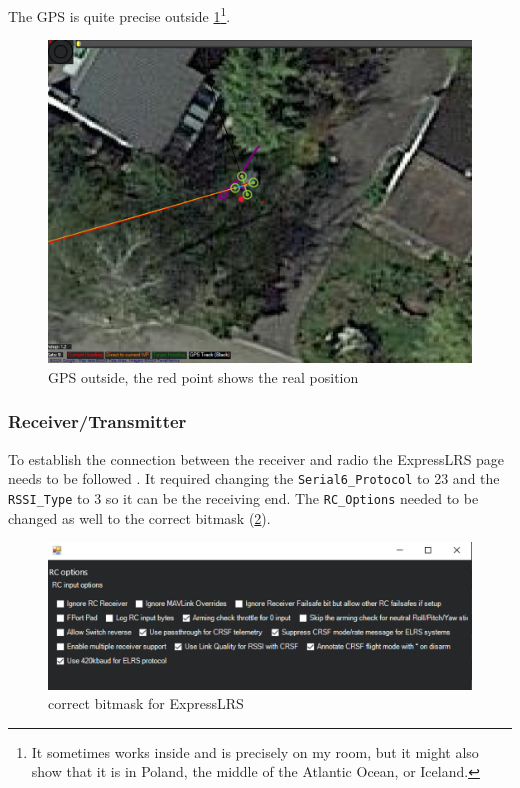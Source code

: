 \documentclass[svgnames]{article}
\begin{document}
	The GPS is quite precise outside \cref{fig:gpsoutside}\footnote{It sometimes works inside and is precisely on my room, but it might also show that it is in Poland, the middle of the Atlantic Ocean, or Iceland.}.
	
\begin{figure}[ht]
	\centering
	\includegraphics[scale=0.2]{pictures/GPS_Outsidewithdot}
	\caption{\gls{GPS} outside, the red point shows the real position}
	\label{fig:gpsoutside}
\end{figure}
	
	

	 
	\subsubsection{Receiver/Transmitter}
	To establish the connection between the receiver and radio the ExpressLRS page needs to be followed \cite{expresslrsorg}. It required changing the \lstinline|Serial6_Protocol| to 23 and the \lstinline|RSSI_Type| to 3 so it can be the receiving end. The \lstinline|RC_Options| needed to be changed as well to the correct bitmask (\cref{fig:bitmask}).

\begin{figure}[ht]
	\centering
	\includegraphics[width=0.7\linewidth]{pictures/bitmask}
	\caption{correct bitmask for ExpressLRS}
	\label{fig:bitmask}
\end{figure}
\end{document}
